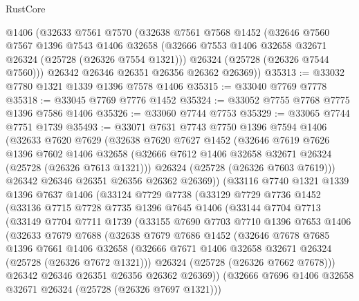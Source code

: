 \begin{lexlean}{RustCore}
\begin{coremodule}
    @1406
    (@32633
      @7561
      @7570
      (@32638
        @7561
        @7568
        @1452
        (@32646
          @7560
          @7567
          @1396
          @7543
          @1406
          @32658
          (@32666 @7553 @1406 @32658 @32671 @26324 (@25728 (@26326 @7554 @1321)))
          @26324
          (@25728 (@26326 @7544 @7560)))
        @26342
        @26346
        @26351
        @26356
        @26362
        @26369))
@35313 := @33032 @7780 @1321 @1339 @1396 @7578 @1406
@35315 := @33040 @7769 @7778
@35318 := @33045 @7769 @7776 @1452
@35324 := @33052 @7755 @7768 @7775 @1396 @7586 @1406
@35326 := @33060 @7744 @7753
@35329 := @33065 @7744 @7751 @1739
@35493 := @33071
    @7631
    @7743
    @7750
    @1396
    @7594
    @1406
    (@32633
      @7620
      @7629
      (@32638
        @7620
        @7627
        @1452
        (@32646
          @7619
          @7626
          @1396
          @7602
          @1406
          @32658
          (@32666 @7612 @1406 @32658 @32671 @26324 (@25728 (@26326 @7613 @1321)))
          @26324
          (@25728 (@26326 @7603 @7619)))
        @26342
        @26346
        @26351
        @26356
        @26362
        @26369))
    (@33116
      @7740
      @1321
      @1339
      @1396
      @7637
      @1406
      (@33124
        @7729
        @7738
        (@33129
          @7729
          @7736
          @1452
          (@33136
            @7715
            @7728
            @7735
            @1396
            @7645
            @1406
            (@33144
              @7704
              @7713
              (@33149
                @7704
                @7711
                @1739
                (@33155
                  @7690
                  @7703
                  @7710
                  @1396
                  @7653
                  @1406
                  (@32633
                    @7679
                    @7688
                    (@32638
                      @7679
                      @7686
                      @1452
                      (@32646
                        @7678
                        @7685
                        @1396
                        @7661
                        @1406
                        @32658
                        (@32666 @7671 @1406 @32658 @32671 @26324 (@25728 (@26326 @7672 @1321)))
                        @26324
                        (@25728 (@26326 @7662 @7678)))
                      @26342
                      @26346
                      @26351
                      @26356
                      @26362
                      @26369))
                  (@32666 @7696 @1406 @32658 @32671 @26324 (@25728 (@26326 @7697 @1321)))

\end{coremodule}
\end{lexlean}
